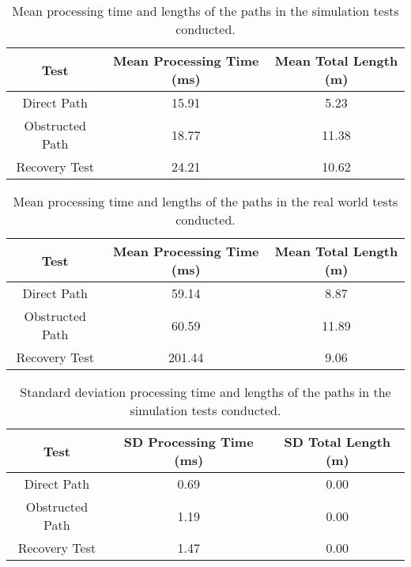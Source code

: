 
\begin{table}[H]
    \centering
    \caption{Mean processing time and lengths of the paths in the simulation tests conducted.}
    \begin{tabular}{|c|c|c|}
        \hline
        \textbf{Test}  & \textbf{Mean Processing Time (ms)} & \textbf{Mean Total Length (m)}\\
        \hline
        Direct Path & 15.91 & 5.23  \\
        \hline
        Obstructed Path & 18.77 & 11.38  \\
        \hline
        Recovery Test & 24.21  & 10.62  \\
        \hline
    \end{tabular}
    \label{tab:mean_processing_time_lengths1}
\end{table}
\begin{table}[H]
    \centering
    \caption{Mean processing time and lengths of the paths in the real world tests conducted.}
    \begin{tabular}{|c|c|c|}
        \hline
        \textbf{Test}  & \textbf{Mean Processing Time (ms)} & \textbf{Mean Total Length (m)}\\
        \hline
        Direct Path & 59.14 & 8.87  \\
        \hline
        Obstructed Path & 60.59 & 11.89  \\
        \hline
        Recovery Test & 201.44  & 9.06  \\
        \hline
    \end{tabular}
    \label{tab:mean_processing_time_lengths2}
\end{table}
\begin{table}[H]
    \centering
    \caption{Standard deviation processing time and lengths of the paths in the simulation tests conducted.}
    \begin{tabular}{|c|c|c|}
        \hline
        \textbf{Test}  & \textbf{SD Processing Time (ms)} & \textbf{SD Total Length (m)}\\
        \hline
        Direct Path & 0.69 & 0.00  \\
        \hline
        Obstructed Path & 1.19 & 0.00  \\
        \hline
        Recovery Test & 1.47  & 0.00  \\
        \hline
    \end{tabular}
    \label{tab:mean_processing_time_lengths1}
\end{table}
